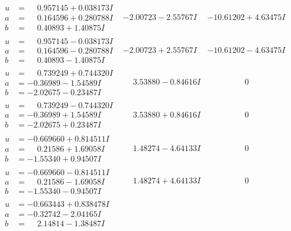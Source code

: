 \documentclass[1p]{elsarticle_modified}
\theoremstyle{definition}
\begin{document}
$$\begin{array}{c|c|c}
\begin{aligned}
u &= \phantom{-}0.957145 + 0.038173 I \\
a &= \phantom{-}0.164596 + 0.280788 I \\
b &= \phantom{-}0.40893 + 1.40875 I\end{aligned}
 & -2.00723 - 2.55767 I & -10.61202 + 4.63475 I \\ \hline\begin{aligned}
u &= \phantom{-}0.957145 - 0.038173 I \\
a &= \phantom{-}0.164596 - 0.280788 I \\
b &= \phantom{-}0.40893 - 1.40875 I\end{aligned}
 & -2.00723 + 2.55767 I & -10.61202 - 4.63475 I \\ \hline\begin{aligned}
u &= \phantom{-}0.739249 + 0.744320 I \\
a &= -0.36989 - 1.54589 I \\
b &= -2.02675 - 0.23487 I\end{aligned}
 & \phantom{-}3.53880 - 0.84616 I & \phantom{-0.000000 } 0 \\ \hline\begin{aligned}
u &= \phantom{-}0.739249 - 0.744320 I \\
a &= -0.36989 + 1.54589 I \\
b &= -2.02675 + 0.23487 I\end{aligned}
 & \phantom{-}3.53880 + 0.84616 I & \phantom{-0.000000 } 0 \\ \hline\begin{aligned}
u &= -0.669660 + 0.814511 I \\
a &= \phantom{-}0.21586 + 1.69058 I \\
b &= -1.55340 + 0.94507 I\end{aligned}
 & \phantom{-}1.48274 - 4.64133 I & \phantom{-0.000000 } 0 \\ \hline\begin{aligned}
u &= -0.669660 - 0.814511 I \\
a &= \phantom{-}0.21586 - 1.69058 I \\
b &= -1.55340 - 0.94507 I\end{aligned}
 & \phantom{-}1.48274 + 4.64133 I & \phantom{-0.000000 } 0 \\ \hline\begin{aligned}
u &= -0.663443 + 0.838478 I \\
a &= -0.32742 - 2.04165 I \\
b &= \phantom{-}2.14814 - 1.38487 I\end{aligned}

\end{array}$$
\end{document}
